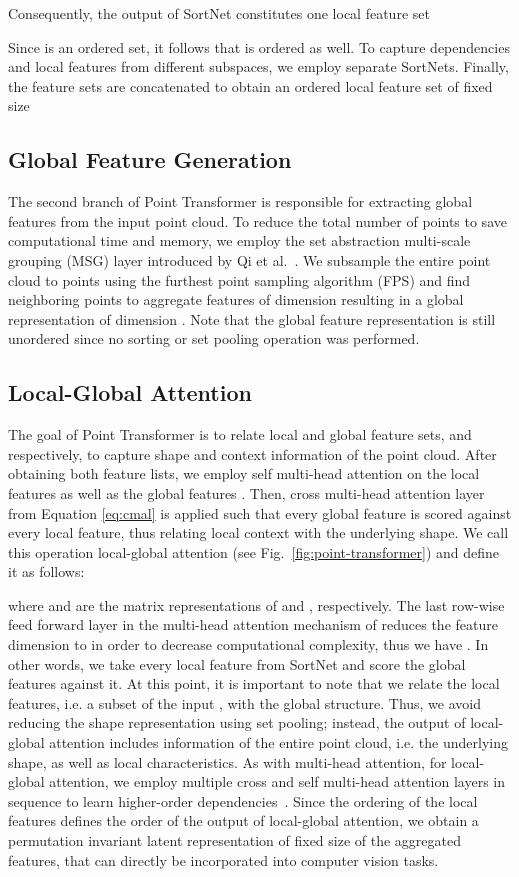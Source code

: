 \documentclass{ieeeaccess}
\begin{document}
Consequently, the output of SortNet constitutes one local feature set

Since  is an ordered set, it follows that  is ordered as well.
To capture dependencies and local features from different subspaces, we employ  separate SortNets. Finally, the  feature sets are concatenated to obtain an ordered local feature set of fixed size


\subsection{Global Feature Generation}
The second branch of Point Transformer is responsible for extracting global features from the input point cloud. 
To reduce the total number of points to save computational time and memory, we employ the set abstraction multi-scale grouping (MSG) layer introduced by Qi et al.~\cite{qi2017pointnet++}. We subsample the entire point cloud to  points using the furthest point sampling algorithm (FPS) and find neighboring points to aggregate features of dimension  resulting in a global representation of dimension . 
Note that the global feature representation is still unordered since no sorting or set pooling operation was performed. 

\subsection{Local-Global Attention}
The goal of Point Transformer is to relate local and global feature sets,  and  respectively, to capture shape and context information of the point cloud.
After obtaining both feature lists, we employ self multi-head attention  on the local features  as well as the global features .
Then, cross multi-head attention layer  from Equation \eqref{eq:cmal} is applied such that every global feature is scored against every local feature, thus relating local context with the underlying shape. We call this operation local-global attention  (see Fig.~\ref{fig:point-transformer}) and define it as follows:

where  and  are the matrix representations of  and , respectively. The last row-wise feed forward layer in the multi-head attention mechanism of  reduces the feature dimension to  in order to decrease computational complexity, thus we have 
\mbox{.} 
In other words, we take every local feature from SortNet and score the global features against it. 
At this point, it is important to note that we relate the local features, i.e. a subset of the input , with the global structure. Thus, we avoid reducing the shape representation using set pooling; instead, the output of local-global attention includes information of the entire point cloud, i.e. the underlying shape, as well as local characteristics.
As with multi-head attention, for local-global attention, we employ multiple cross and self multi-head attention layers in sequence to learn higher-order dependencies~\cite{vaswani2017attention}. Since the ordering of the local features  defines the order of the output of local-global attention, we obtain a permutation invariant latent representation of fixed size of the aggregated features, that can directly be incorporated into computer vision tasks. 
\end{document}
